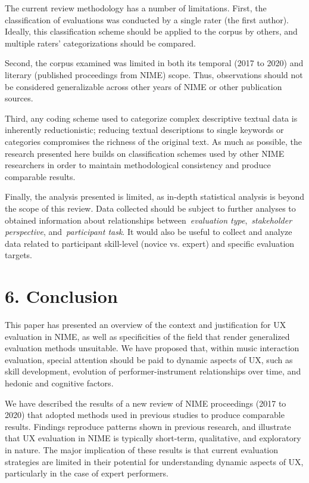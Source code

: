 \documentclass[sigconf]{nimeart}
\begin{document}
The current review methodology has a number of limitations. First, the classification of evaluations was conducted by a single rater (the first author). Ideally, this classification scheme should be applied to the corpus by others, and multiple raters' categorizations should be compared.~

Second, the corpus examined was limited in both its temporal (2017 to 2020) and literary (published proceedings from NIME) scope. Thus, observations should not be considered generalizable across other years of NIME or other publication sources.~

Third, any coding scheme used to categorize complex descriptive textual data is inherently reductionistic; reducing textual descriptions to single keywords or categories compromises the richness of the original text. As much as possible, the research presented here builds on classification schemes used by other NIME researchers in order to maintain methodological consistency and produce comparable results.

Finally, the analysis presented is limited, as in-depth statistical analysis is beyond the scope of this review. Data collected should be subject to further analyses to obtained information about relationships between~\emph{evaluation type},~\emph{stakeholder perspective}, and~\emph{participant task}. It would also be useful to collect and analyze data related to participant skill-level (novice vs. expert) and specific evaluation targets.~

\section{6. Conclusion}\label{conclusion}

This paper has presented an overview of the context and justification for UX evaluation in NIME, as well as specificities of the field that render generalized evaluation methods unsuitable. We have proposed that, within music interaction evaluation, special attention should be paid to dynamic aspects of UX, such as skill development, evolution of performer-instrument relationships over time, and hedonic and cognitive factors.

We have described the results of a new review of NIME proceedings (2017 to 2020) that adopted methods used in previous studies to produce comparable results. Findings reproduce patterns shown in previous research, and illustrate that UX evaluation in NIME is typically short-term, qualitative, and exploratory in nature. The major implication of these results is that current evaluation strategies are limited in their potential for understanding dynamic aspects of UX, particularly in the case of expert performers.~
\end{document}
